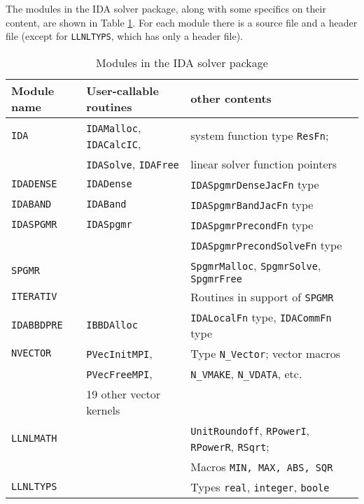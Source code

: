 \documentclass[11pt]{article}
\begin{document}
The modules in the IDA solver package, along with some specifics on
their content, are shown in Table \ref{IDAmodules}.  For each module
there is a source file and a header file (except for {\tt LLNLTYPS},
which has only a header file).

\begin{table}%
\begin{center}
\caption{Modules in the IDA solver package}
\label{IDAmodules}
\vspace{0.1 in}
\begin{tabular}{|l|l|l|} \hline
Module name & User-callable routines & other contents \\ \hline \hline
{\tt IDA}      & {\tt IDAMalloc}, {\tt IDACalcIC}, 
                                 & system function type {\tt ResFn}; \\
               & {\tt IDASolve}, {\tt IDAFree}  
                                 & linear solver function pointers \\
                                                                 \hline\hline

{\tt IDADENSE} &  {\tt IDADense} &  {\tt IDASpgmrDenseJacFn} type \\
                                                                 \hline\hline

{\tt IDABAND}  &  {\tt IDABand} &  {\tt IDASpgmrBandJacFn} type \\
                                                                 \hline\hline

{\tt IDASPGMR} &  {\tt IDASpgmr} &  {\tt IDASpgmrPrecondFn} type \\
               &              &  {\tt IDASpgmrPrecondSolveFn} type \\ \hline
{\tt SPGMR}    & & {\tt SpgmrMalloc}, {\tt SpgmrSolve}, {\tt SpgmrFree} \\ \hline
{\tt ITERATIV} & & Routines in support of {\tt SPGMR} \\
                                                                 \hline\hline

{\tt IDABBDPRE}&  {\tt IBBDAlloc} & {\tt IDALocalFn} type, {\tt IDACommFn} type \\
                                                                 \hline\hline

{\tt NVECTOR}  & {\tt PVecInitMPI},  & Type {\tt N\_Vector}; vector macros \\
               & {\tt PVecFreeMPI},  & {\tt N\_VMAKE}, {\tt N\_VDATA}, etc. \\
               & 19 other vector kernels   & \\ \hline
{\tt LLNLMATH} & & {\tt UnitRoundoff}, {\tt RPowerI}, {\tt RPowerR}, {\tt RSqrt}; \\
               & & Macros {\tt MIN, MAX, ABS, SQR} \\ \hline
{\tt LLNLTYPS} & & Types {\tt real}, {\tt integer}, {\tt boole} \\ \hline

\end{tabular}
\end{center}
\end{table}
\end{document}
